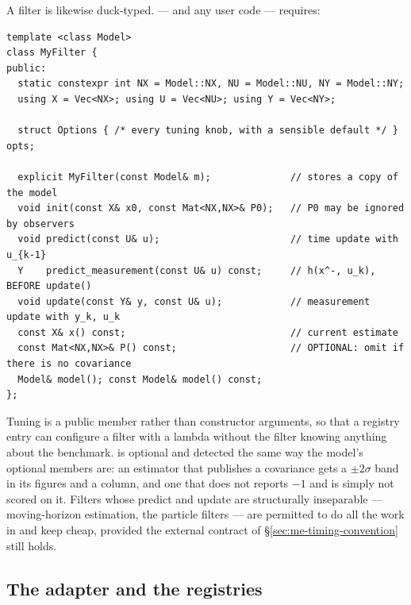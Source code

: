 A filter is likewise duck-typed.  --- and any user code --- requires:

\begin{lstlisting}
template <class Model>
class MyFilter {
public:
  static constexpr int NX = Model::NX, NU = Model::NU, NY = Model::NY;
  using X = Vec<NX>; using U = Vec<NU>; using Y = Vec<NY>;

  struct Options { /* every tuning knob, with a sensible default */ } opts;

  explicit MyFilter(const Model& m);              // stores a copy of the model
  void init(const X& x0, const Mat<NX,NX>& P0);   // P0 may be ignored by observers
  void predict(const U& u);                       // time update with u_{k-1}
  Y    predict_measurement(const U& u) const;     // h(x^-, u_k), BEFORE update()
  void update(const Y& y, const U& u);            // measurement update with y_k, u_k
  const X& x() const;                             // current estimate
  const Mat<NX,NX>& P() const;                    // OPTIONAL: omit if there is no covariance
  Model& model(); const Model& model() const;
};
\end{lstlisting}

Tuning is a public  member rather than constructor arguments, so that a registry entry
can configure a filter with a lambda without the filter knowing anything about the benchmark.
 is optional and detected the same way the model's optional members are: an estimator
that publishes a covariance gets a $\pm2\sigma$ band in its figures and a  column,
and one that does not reports $-1$ and is simply not scored on it. Filters whose predict and update
are structurally inseparable --- moving-horizon estimation, the particle filters --- are permitted
to do all the work in  and keep  cheap, provided the external
contract of \S\ref{sec:me-timing-convention} still holds.

\subsection{The adapter and the registries}

